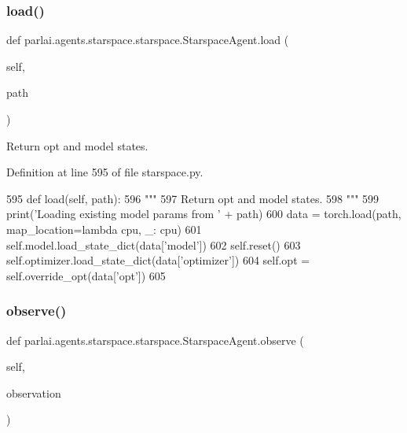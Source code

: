 \subsubsection{\texorpdfstring{load()}{load()}}
{\footnotesize\ttfamily def parlai.\+agents.\+starspace.\+starspace.\+Starspace\+Agent.\+load (\begin{DoxyParamCaption}\item[{}]{self,  }\item[{}]{path }\end{DoxyParamCaption})}

\begin{DoxyVerb}Return opt and model states.
\end{DoxyVerb}
 

Definition at line 595 of file starspace.\+py.


\begin{DoxyCode}
595     \textcolor{keyword}{def }load(self, path):
596         \textcolor{stringliteral}{"""}
597 \textcolor{stringliteral}{        Return opt and model states.}
598 \textcolor{stringliteral}{        """}
599         print(\textcolor{stringliteral}{'Loading existing model params from '} + path)
600         data = torch.load(path, map\_location=\textcolor{keyword}{lambda} cpu, \_: cpu)
601         self.model.load\_state\_dict(data[\textcolor{stringliteral}{'model'}])
602         self.reset()
603         self.optimizer.load\_state\_dict(data[\textcolor{stringliteral}{'optimizer'}])
604         self.opt = self.override\_opt(data[\textcolor{stringliteral}{'opt'}])
605 \end{DoxyCode}
\mbox{\label{classparlai_1_1agents_1_1starspace_1_1starspace_1_1StarspaceAgent_a788b504ead65ec6af074717226cc07bb}} 
\subsubsection{\texorpdfstring{observe()}{observe()}}
{\footnotesize\ttfamily def parlai.\+agents.\+starspace.\+starspace.\+Starspace\+Agent.\+observe (\begin{DoxyParamCaption}\item[{}]{self,  }\item[{}]{observation }\end{DoxyParamCaption})}



